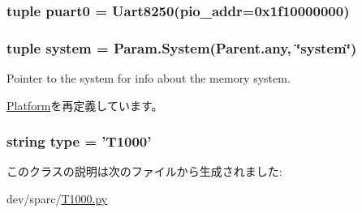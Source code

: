 \label{classT1000_1_1T1000_a4a5dca31994bd39c47b8e64cd61e2bb5}
\hypertarget{classT1000_1_1T1000_a3e93dc0da948aa69a8c3abdf7e1b9ff1}{
\subsubsection[{puart0}]{\setlength{\rightskip}{0pt plus 5cm}tuple {\bf puart0} = {\bf Uart8250}(pio\_\-addr=0x1f10000000)}}
\label{classT1000_1_1T1000_a3e93dc0da948aa69a8c3abdf7e1b9ff1}
\hypertarget{classT1000_1_1T1000_ab737471139f5a296e5b26e8a0e1b0744}{
\subsubsection[{system}]{\setlength{\rightskip}{0pt plus 5cm}tuple {\bf system} = Param.System(Parent.any, \char`\"{}system\char`\"{})}}
\label{classT1000_1_1T1000_ab737471139f5a296e5b26e8a0e1b0744}
Pointer to the system for info about the memory system. 

\hyperlink{classPlatform_af27ccd765f13a4b7bd119dc7579e2746}{Platform}を再定義しています。\hypertarget{classT1000_1_1T1000_acce15679d830831b0bbe8ebc2a60b2ca}{
\subsubsection[{type}]{\setlength{\rightskip}{0pt plus 5cm}string {\bf type} = '{\bf T1000}'}}
\label{classT1000_1_1T1000_acce15679d830831b0bbe8ebc2a60b2ca}


このクラスの説明は次のファイルから生成されました:\begin{DoxyCompactItemize}
\item 
dev/sparc/\hyperlink{T1000_8py}{T1000.py}\end{DoxyCompactItemize}
